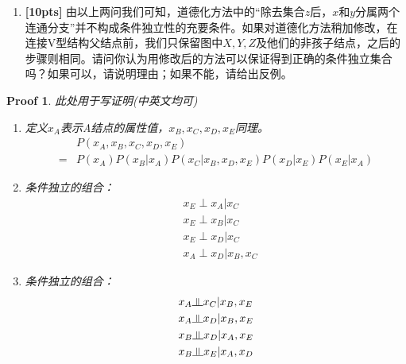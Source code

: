 \documentclass[a4paper,UTF8]{article}
\numberwithin{equation}{section}
\newtheorem*{myProof}{Proof}
\newcommand{\indep}{\rotatebox[origin=c]{90}{$\models$}}
\begin{document}
\begin{enumerate}[(1)]
\begin{def-box}[阻塞]
		1. $P$中存在顺序结构$x\rightarrow z\rightarrow y$或同父结构$x\leftarrow z\rightarrow y$，结点$z$包含在集合$Z$中；
		
		2. $P$中存在V型结构$x\rightarrow z \leftarrow y$，结点$z$及其孩子结点不包含在集合Z中。
		
	\end{def-box}
	\begin{theorem}[条件独立]
		\label{theorem}
		设$X,Y,Z$分别是一个有向无环图$G$里互没有交集的结点集，如果集合$Z$阻塞$X$到$Y$的任何一条道路，则$X$和$Y$在给定$Z$时条件独立，即$X\indep Y|Z$。
	\end{theorem}
	请根据定理\ref{theorem}，判断第一问中有哪些条件独立的组合（独立也算条件独立的一种特例）。
	
	\item \textbf{[10pts]} 由以上两问我们可知，道德化方法中的“除去集合$z$后，$x$和$y$分属两个连通分支”并不构成条件独立性的充要条件。如果对道德化方法稍加修改，在连接V型结构父结点前，我们只保留图中$X,Y,Z$及他们的非孩子结点，之后的步骤则相同。请问你认为用修改后的方法可以保证得到{\color{red}{全部的}}正确的条件独立集合吗？如果可以，请说明理由；如果不能，请给出反例。
	
\end{enumerate}
\begin{myProof}
	此处用于写证明(中英文均可)
	~\\
\begin{enumerate}[(1)]
\item 
定义$x_A$表示A结点的属性值，$x_B,x_C,x_D,x_E$同理。\\
\begin{equation}
\begin{aligned}
&P(x_A,x_B,x_C,x_D,x_E)\\ 
=& P(x_A)P(x_B|x_A)P(x_C|x_B,x_D,x_E)P(x_D|x_E)P(x_E|x_A)
\end{aligned}
\end{equation}
\item 
条件独立的组合：\\
\begin{equation}
\begin{aligned}
&x_E \perp x_A | x_C\\
&x_E \perp x_B | x_C\\
&x_E \perp x_D | x_C\\
&x_A \perp x_D | x_B, x_C
\end{aligned}
\end{equation}
\item 
条件独立的组合：\\
\begin{equation}
\begin{aligned}
&x_A \indep x_C | x_B,x_E\\
&x_A \indep x_D | x_B,x_E\\
&x_B \indep x_D | x_A,x_E\\
&x_B \indep x_E | x_A,x_D
\end{aligned}
\end{equation}
\end{enumerate}
\end{myProof}
\newpage
\end{document}
